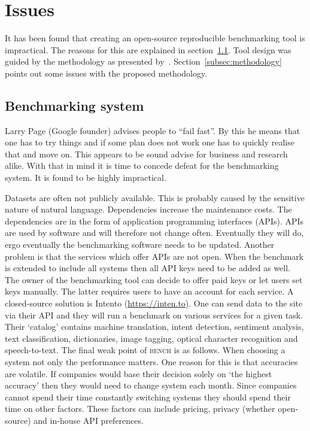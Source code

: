 \section{Issues}
\label{sec:issues}

It has been found that creating an open-source reproducible benchmarking tool is impractical.
The reasons for this are explained in section~\ref{subsec:benchmarking_system}.
Tool design was guided by the methodology as presented by~\citet{braun2017}.
Section~\ref{subsec:methodology} points out some issues with the proposed methodology.

\subsection{Benchmarking system}
\label{subsec:benchmarking_system}
Larry Page (Google founder) advises people to ``fail fast''.
By this he means that one has to try things and if some plan does not work one has to quickly realise that and move on.
This appears to be sound advise for business and research alike.
With that in mind it is time to concede defeat for the benchmarking system.
It is found to be highly impractical.

Datasets are often not publicly available.
This is probably caused by the sensitive nature of natural language.
Dependencies increase the maintenance costs.
The dependencies are in the form of application programming interfaces (APIs).
APIs are used by software and will therefore not change often.
Eventually they will do, ergo eventually the benchmarking software needs to be updated.
Another problem is that the services which offer APIs are not open.
When the benchmark is extended to include all systems then all API keys need to be added as well.
The owner of the benchmarking tool can decide to offer paid keys or let users set keys manually.
The latter requires users to have an account for each service.
A closed-source solution is Intento (\url{https://inten.to}).
One can send data to the site via their API and they will run a benchmark on various services for a given task.
Their `catalog' contains machine translation, intent detection, sentiment analysis, text classification, dictionaries, image tagging, optical character recognition and speech-to-text.
The final weak point of \textsc{bench} is as follows.
When choosing a system not only the performance matters.
One reason for this is that accuracies are volatile.
If companies would base their decision solely on `the highest accuracy' then they would need to change system each month.
Since companies cannot spend their time constantly switching systems they should spend their time on other factors.
These factors can include pricing, privacy (whether open-source) and in-house API preferences.

